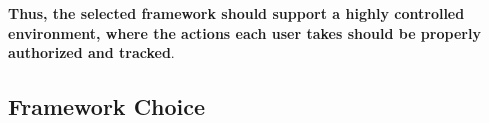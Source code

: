\textbf{Thus, the selected framework should support a highly controlled environment, where the actions each user takes should be properly authorized and tracked}.


\subsection{Framework Choice}



